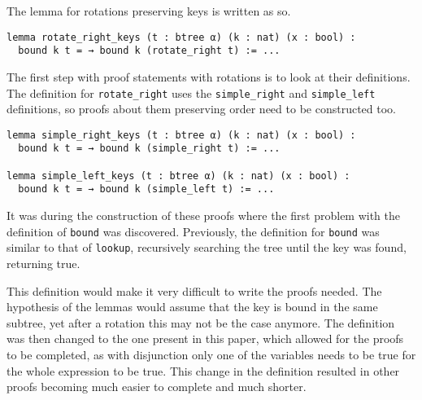 The lemma for rotations preserving keys is written as so.

\begin{lstlisting}
lemma rotate_right_keys (t : btree α) (k : nat) (x : bool) :
  bound k t = → bound k (rotate_right t) := ...
\end{lstlisting}

The first step with proof statements with rotations is to look at their definitions. The definition for \lstinline{rotate_right} uses the \lstinline{simple_right} and \lstinline{simple_left} definitions, so proofs about them preserving order need to be constructed too.

\begin{lstlisting}[caption=\empty]
lemma simple_right_keys (t : btree α) (k : nat) (x : bool) :
  bound k t = → bound k (simple_right t) := ...
  
lemma simple_left_keys (t : btree α) (k : nat) (x : bool) :
  bound k t = → bound k (simple_left t) := ...
\end{lstlisting}

It was during the construction of these proofs where the first problem with the definition of \lstinline{bound} was discovered. Previously, the definition for \lstinline{bound} was similar to that of \lstinline{lookup}, recursively searching the tree until the key was found, returning true.

This definition would make it very difficult to write the proofs needed. The hypothesis of the lemmas would assume that the key is bound in the same subtree, yet after a rotation this may not be the case anymore. The definition was then changed to the one present in this paper, which allowed for the proofs to be completed, as with disjunction only one of the variables needs to be true for the whole expression  to be true. This change in the definition resulted in other proofs becoming much easier to complete and much shorter. 